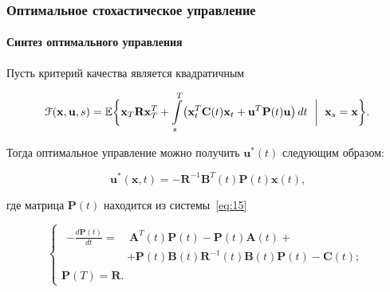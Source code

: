 \documentclass[ignorenonframetext,hyperref={pdftex,unicode},compress]{beamer}
\begin{document}
\begin{frame}
	\frametitle{Оптимальное стохастическое управление}
	\framesubtitle{Синтез оптимального управления}\small
    
    Пусть критерий качества является квадратичным

    \begin{equation}\label{eq:13}
    	\mathcal{F}(\mathbf{x}, \mathbf{u}, s) = \mathbb{E} \biggl\{ \mathbf{x}_T\mathbf{R}\mathbf{x}_T^T + \int\limits_s^T \bigr( \mathbf{x}_t^T\mathbf{C}(t)\mathbf{x}_t + \mathbf{u}^T\mathbf{P}(t)\mathbf{u} \bigl)\,dt~\biggm|~ \mathbf{x}_s = \mathbf{x} \biggr\} \text{.}
    \end{equation}
    
    Тогда оптимальное управление можно получить $\mathbf{u}^*(t)$ следующим образом:
    
    \begin{equation}\label{eq:14}
    	\mathbf{u}^*(\mathbf{x}, t) = -\mathbf{R}^{-1}\mathbf{B}^T(t)\mathbf{P}(t)\mathbf{x}(t) \text{,}
    \end{equation}

    где матрица $\mathbf{P}(t)$ находится из системы~\ref{eq:15}

    \begin{equation}\label{eq:15}
    	\begin{cases}
    		\begin{split}
    			-\frac{d\mathbf{P}(t)}{dt} =&~\mathbf{A}^T(t)\mathbf{P}(t) - \mathbf{P}(t)\mathbf{A}(t) +\\
                &+ \mathbf{P}(t)\mathbf{B}(t)\mathbf{R}^{-1}(t)\mathbf{B}(t)\mathbf{P}(t) - \mathbf{C}(t) \text{;}
			\end{split} \\
			\mathbf{P}(T) = \mathbf{R} \text{.}
		\end{cases}    
    \end{equation}
\end{frame}
\end{document}
